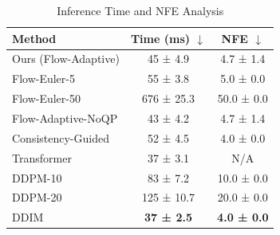 \documentclass[conference]{IEEEtran}
\begin{document}
\begin{table}[t]
\centering
\caption{Inference Time and NFE Analysis}
\label{tab:inference_nfe}
\begin{tabular}{@{}lcc@{}}
\toprule
\textbf{Method} & \textbf{Time (ms)} $\downarrow$ & \textbf{NFE} $\downarrow$ \\
\midrule
Ours (Flow-Adaptive)      & 45 ± 4.9   & 4.7 ± 1.4 \\
Flow-Euler-5              & 55 ± 3.8   & 5.0 ± 0.0 \\
Flow-Euler-50             & 676 ± 25.3 & 50.0 ± 0.0 \\
Flow-Adaptive-NoQP        & 43 ± 4.2   & 4.7 ± 1.4 \\
Consistency-Guided          & 52 ± 4.5   & 4.0 ± 0.0 \\
Transformer               & 37 ± 3.1   & N/A \\
DDPM-10                   & 83 ± 7.2   & 10.0 ± 0.0 \\
DDPM-20                   & 125 ± 10.7 & 20.0 ± 0.0 \\
DDIM                      & \textbf{37 ± 2.5} & \textbf{4.0 ± 0.0} \\
\bottomrule
\end{tabular}
\end{table}

\end{document}
